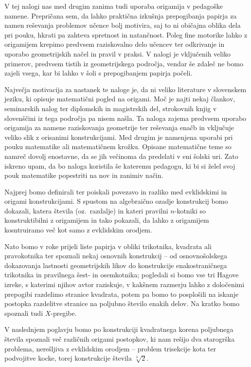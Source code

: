 V tej nalogi nas med drugim zanima tudi uporaba origamija v pedagoške namene. Prepričana sem, da lahko praktična izkušnja prepogibanja papirja za namen reševanja problemov učence bolj motivira, saj to ni običajna oblika dela pri pouku, hkrati pa zahteva spretnost in natančnost. Poleg fine motorike lahko z origamijem krepimo predvsem raziskovalno delo učencev ter odkrivanje in uporabo geometrijskih načel in pravil v praksi. V nalogi je vključenih veliko primerov, predvsem tistih iz geometrijskega področja, vendar še zdaleč ne bomo zajeli vsega, kar bi lahko v šoli s prepogibanjem papirja počeli.

Največja motivacija za nastanek te naloge je, da ni veliko literature v slovenskem jeziku, ki opisuje matematični pogled na origami. Moč je najti nekaj člankov, seminarskih nalog ter diplomskih in magistrskih del, strokovnih knjig v slovenščini iz tega področja pa nisem našla. Ta naloga zajema predvsem uporabo origamija za namene raziskovanja geometrije ter reševanja enačb in vključuje veliko slik z orisanimi konstrukcijami. Med drugim je namenjena uporabi pri pouku matematike ali matematičnem krožku. Opisane matematične teme so namreč dovolj enostavne, da se jih večinoma da predelati v eni šolski uri. Zato iskreno upam, da bo naloga koristila še kateremu pedagogu, ki bi si želel svoj pouk matematike popestriti na nov in zanimiv način.

Najprej bomo definirali ter poiskali povezavo in razliko med evklidskimi in origami konstrukcijami. S spustom na algebraično ozadje konstrukcij bomo dokazali, katera števila (oz.\ razdalje) in kateri pravilni $n$-kotniki so konstruktibilni z origamijem in tako pokazali, da lahko z origamijem kosntruiramo več kot samo z evklidskim orodjem.

Nato bomo v roke prijeli liste papirja v obliki trikotnika, kvadrata ali pravokotnika ter spoznali nekaj osnovnih konstrukcij -- od osnovnošolskega dokazovanja lastnosti geometrijskih likov do konstrukcije enakostraničnega trikotnika in pravilnega šest- in osemkotnika; pogledali si bomo vse tri Hagove izreke, s katerimi njihov avtor raziskuje, v kakšnem razmerju lahko z določenimi prepogibi razdelimo stranice kvadrata, potem pa bomo to posplošili na iskanje postopka razdelitve stranice na poljubno število enakih delov. Na kratko bomo spoznali tudi $X$-pregibe.

V naslednjem poglavju bomo po konstrukciji kvadratnega korena poljubnega števila spoznali več različnih origami postopkov, ki nam rešijo dva starogrška problema, nerešljiva z evklidskim orodjem -- problem trisekcije kota ter podvojitve kocke, torej konstrukcije števila $\sqrt[3]{2}$.

